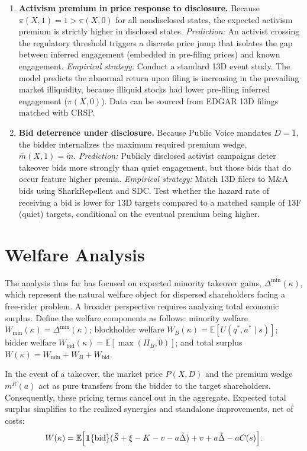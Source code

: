 \documentclass[11pt]{article}
\newcommand{\E}{\mathbb{E}}
\newcommand{\1}{\mathbf{1}}
\begin{document}
\begin{enumerate}[label=\textbf{\arabic*.}]
    \item \textbf{Activism premium in price response to disclosure.} Because $\pi(X,1) = 1 > \pi(X,0)$ for all nondisclosed states, the expected activism premium is strictly higher in disclosed states.
    \emph{Prediction:} An activist crossing the regulatory threshold triggers a discrete price jump that isolates the gap between inferred engagement (embedded in pre-filing prices) and known engagement.
    \emph{Empirical strategy:} Conduct a standard 13D event study. The model predicts the abnormal return upon filing is increasing in the prevailing market illiquidity, because illiquid stocks had lower pre-filing inferred engagement ($\pi(X,0)$). Data can be sourced from EDGAR 13D filings matched with CRSP.

    \item \textbf{Bid deterrence under disclosure.} Because Public Voice mandates $D=1$, the bidder internalizes the maximum required premium wedge, $\bar{m}(X,1) = \tilde{m}$.
    \emph{Prediction:} Publicly disclosed activist campaigns deter takeover bids more strongly than quiet engagement, but those bids that do occur feature higher premia.
    \emph{Empirical strategy:} Match 13D filers to M\&A bids using SharkRepellent and SDC. Test whether the hazard rate of receiving a bid is lower for 13D targets compared to a matched sample of 13F (quiet) targets, conditional on the eventual premium being higher.
\end{enumerate}

\section{Welfare Analysis}
\label{sec:welfare}

The analysis thus far has focused on expected minority takeover gains, $\Delta^{\min}(\kappa)$, which represent the natural welfare object for dispersed shareholders facing a free-rider problem. A broader perspective requires analyzing total economic surplus. Define the welfare components as follows: minority welfare $W_{\text{min}}(\kappa) = \Delta^{\min}(\kappa)$; blockholder welfare $W_B(\kappa) = \E[U(q^*, a^* \mid s)]$; bidder welfare $W_{\text{bid}}(\kappa) = \E[\max(\Pi_B, 0)]$; and total surplus $W(\kappa) = W_{\text{min}} + W_B + W_{\text{bid}}$.

In the event of a takeover, the market price $P(X,D)$ and the premium wedge $m^{R}(a)$ act as pure transfers from the bidder to the target shareholders. Consequently, these pricing terms cancel out in the aggregate. Expected total surplus simplifies to the realized synergies and standalone improvements, net of costs:
\begin{equation}
W(\kappa) = \E\Bigl[ \1\{\text{bid}\} (\bar{S} + \xi - K - v - a\tilde{\Delta}) + v + a\tilde{\Delta} - a C(s) \Bigr].
\end{equation}
\end{document}
